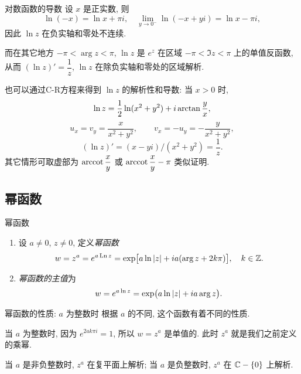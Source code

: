 \begin{frame}{对数函数的导数}
\beqskip{1pt}
	\onslide<+->
	设 $x$ 是正实数, 
	\onslide<+->
	则
	\[\ln (-x)=\ln x+\pi i,\quad
	\lim_{y\to0^-}\ln (-x+yi)=\ln x-\pi i,\]
	\onslide<+->
	因此 $\ln z$ 在负实轴和零处不连续.

	\onslide<+->
	而在其它地方 $-\pi<\arg z<\pi$, $\ln z$ 是 $e^z$ 在区域 $-\pi<\Im z<\pi$ 上的单值反函数, 
	\onslide<+->
	从而
	\alert{$(\ln z)'=\dfrac 1z$},
	\alert{$\ln z$ 在除负实轴和零处的区域解析}.

	\onslide<+->
	也可以通过C-R方程来得到 $\ln z$ 的解析性和导数: 当 $x>0$ 时,
	\[\ln z=\frac{1}{2} \ln(x^2+y^2)+i\arctan \frac yx,\]
	\onslide<+->
	\[u_x=v_y=\frac x{x^2+y^2},\qquad v_x=-u_y=-\frac y{x^2+y^2},\]
	\[(\ln z)'=(x-yi)/(x^2+y^2)=\frac 1z.\]
	其它情形可取虚部为 $\operatorname{arccot}\dfrac xy$ 或 $\operatorname{arccot}\dfrac xy-\pi$ 类似证明.
\endgroup
\end{frame}


\subsection{幂函数}

\begin{frame}{幂函数}
	\onslide<+->
	\begin{definition}[幂函数]
		\begin{enumerate}
			\item 设 $a\neq 0$, $z\neq 0$, 定义\emph{幂函数}
			\[w=z^a=e^{a\operatorname{Ln} z}
			=\exp\bigl[a\ln\left|z\right|+ia(\arg z+2k\pi)\bigr],\quad k\in{\mathbb{Z}}.\]
			\item \emph{幂函数的主值}为
			\[w=e^{a\ln z}=\exp\bigl(a\ln\left|z\right|+ia\arg z\bigr).\]
		\end{enumerate}
		\vspace{-\baselineskip}
	\end{definition}
\end{frame}


\begin{frame}{幂函数的性质: $a$ 为整数时}
	\onslide<+->
	根据 $a$ 的不同, 这个函数有着不同的性质.

	\onslide<+->
	当 $a$ 为整数时, 因为 $e^{2ak\pi i}=1$, 所以 $w=z^a$ 是单值的.
	\onslide<+->
	此时 $z^a$ 就是我们之前定义的乘幂.

	\onslide<+->
	当 $a$ 是非负整数时, $z^a$ 在复平面上解析;
	\onslide<+->
	当 $a$ 是负整数时, $z^a$ 在 ${\mathbb{C}}-{\left\{0\right\}}$ 上解析.
\end{frame}


